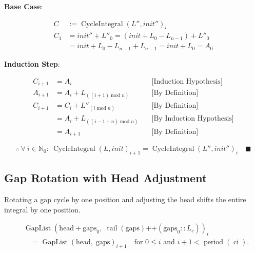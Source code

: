 \textbf{Base Case}:

\begin{equation*}
\begin{aligned}
C &:= \operatorname{CycleIntegral}(L'', init'')_{i} \\
C_1 &= init'' + L''_0 = (init + L_0 - L_{n-1}) + L''_0 \\
    &= init + L_0 - L_{n-1} + L_{n-1} = init + L_0 = A_0
\end{aligned}
\end{equation*}

\textbf{Induction Step}:

\begin{equation*}
\begin{aligned}
C_{i+1} &= A_i \quad &\text{[Induction Hypothesis]} \\
A_{i+1} &= A_i + L_{((i + 1) \operatorname{mod} n)} \quad &\text{[By Definition]} \\
C_{i+1} &= C_{i} + L''_{(i \operatorname{mod} n)} \quad &\text{[By Definition]} \\
       &= A_i + L_{((i - 1 + n) \operatorname{mod} n)} \quad &\text{[By Induction Hypothesis]} \\
       &= A_{i+1} \quad &\text{[By Definition]}
\end{aligned}
\end{equation*}

\begin{equation*}
\therefore \ \forall \ i \in \mathbb{N}_0: \ \operatorname{CycleIntegral}(L, init)_{i+1} = \operatorname{CycleIntegral}(L'', init'')_{i} \quad \blacksquare
\end{equation*}

\subsection{Gap Rotation with Head Adjustment}

Rotating a gap cycle by one position and adjusting the head shifts the
entire integral by one position.

\begin{equation*}
\begin{aligned}
&\operatorname{GapList}(\text{head} + \text{gaps}_0,\; \operatorname{tail}(\text{gaps}) \mathbin{\texttt{++}} (\text{gaps}_0 :: L_e))_i \\
  &\quad = \operatorname{GapList}(\text{head},\; \text{gaps})_{i + 1}
  \quad \text{for } 0 \leq i \text{ and } i + 1 < \operatorname{period}(\operatorname{ci}).
\end{aligned}
\end{equation*}

